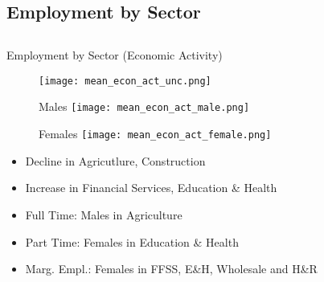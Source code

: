 \documentclass[hyperref={bookmarks=false}]{beamer}
\begin{document}
\begin{appendix}
%


\section{Employment by Sector}
\subsection{}

\begin{frame}
\label{SECT}
\end{frame}

\begin{frame}{Employment by Sector (Economic Activity)}
\begin{figure}[!t]
\centering
\begin{minipage}[b]{0.32\textwidth}{}
\centering
\texttt{[image: mean\_econ\_act\_unc.png]}
\end{minipage}
\begin{minipage}[b]{0.32\textwidth}{Males}
\centering
\texttt{[image: mean\_econ\_act\_male.png]}
\end{minipage}
\begin{minipage}[b]{0.32\textwidth}{Females}
\centering
\texttt{[image: mean\_econ\_act\_female.png]}
\end{minipage}
\end{figure}
\begin{itemize}
\setlength{\itemsep}{0.7 cm}
\item Decline in Agricutlure, Construction
\item Increase in Financial Services, Education \& Health
\item Full Time: Males in Agriculture
\item Part Time: Females in Education \& Health
\item Marg. Empl.: Females in FFSS, E\&H, Wholesale and H\&R
\end{itemize}
\end{frame}


\end{appendix}
\end{document}
